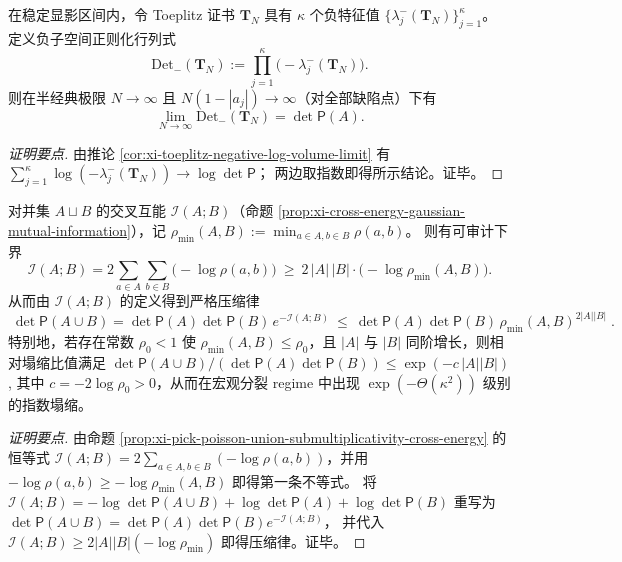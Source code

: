 \begin{corollary}\label{cor:xi-toeplitz-negative-regularized-determinant-limit}
在稳定显影区间内，令 Toeplitz 证书 \(\mathbf{T}_N\) 具有 \(\kappa\) 个负特征值 \(\{\lambda_j^{-}(\mathbf{T}_N)\}_{j=1}^{\kappa}\)。
定义负子空间正则化行列式
\[
\mathrm{Det}_{-}(\mathbf{T}_N):=\prod_{j=1}^{\kappa}\bigl(-\lambda_j^{-}(\mathbf{T}_N)\bigr).
\]
则在半经典极限 \(N\to\infty\) 且 \(N(1-|a_j|)\to\infty\)（对全部缺陷点）下有
\[
\boxed{\;
\lim_{N\to\infty}\mathrm{Det}_{-}(\mathbf{T}_N)=\det\mathsf P(A).\;}
\]
\end{corollary}
\begin{proof}[证明要点]
由推论 \ref{cor:xi-toeplitz-negative-log-volume-limit} 有
\(\sum_{j=1}^{\kappa}\log(-\lambda_j^{-}(\mathbf{T}_N))\to \log\det\mathsf P\)；
两边取指数即得所示结论。证毕。
\end{proof}

\begin{corollary}\label{cor:xi-cross-energy-lower-bound-by-min-separation}
对并集 \(A\sqcup B\) 的交叉互能 \(\mathcal I(A;B)\)（命题 \ref{prop:xi-cross-energy-gaussian-mutual-information}），记
\(
\rho_{\min}(A,B):=\min_{a\in A,b\in B}\rho(a,b)
\)。
则有可审计下界
\[
\boxed{\;
\mathcal I(A;B)
=2\sum_{a\in A}\sum_{b\in B}\bigl(-\log\rho(a,b)\bigr)
\ \ge\
2\,|A|\,|B|\cdot\bigl(-\log\rho_{\min}(A,B)\bigr).\;}
\]
从而由 \(\mathcal I(A;B)\) 的定义得到严格压缩律
\[
\boxed{\;
\det\mathsf P(A\cup B)
=\det\mathsf P(A)\det\mathsf P(B)\,e^{-\mathcal I(A;B)}
\ \le\
\det\mathsf P(A)\det\mathsf P(B)\,\rho_{\min}(A,B)^{2|A||B|}\; }.
\]
特别地，若存在常数 \(\rho_0<1\) 使 \(\rho_{\min}(A,B)\le \rho_0\)，且 \(|A|\) 与 \(|B|\) 同阶增长，则相对塌缩比值满足
\(
\det\mathsf P(A\cup B)\big/(\det\mathsf P(A)\det\mathsf P(B))
\le \exp(-c\,|A||B|)
\),
其中 \(c=-2\log\rho_0>0\)，从而在宏观分裂 regime 中出现 \(\exp(-\Theta(\kappa^2))\) 级别的指数塌缩。
\end{corollary}
\begin{proof}[证明要点]
由命题 \ref{prop:xi-pick-poisson-union-submultiplicativity-cross-energy} 的恒等式
\(\mathcal I(A;B)=2\sum_{a\in A,b\in B}(-\log\rho(a,b))\)，并用
\(-\log\rho(a,b)\ge -\log\rho_{\min}(A,B)\) 即得第一条不等式。
将 \(\mathcal I(A;B)=-\log\det\mathsf P(A\cup B)+\log\det\mathsf P(A)+\log\det\mathsf P(B)\) 重写为
\(
\det\mathsf P(A\cup B)=\det\mathsf P(A)\det\mathsf P(B)e^{-\mathcal I(A;B)}
\)，
并代入 \(\mathcal I(A;B)\ge 2|A||B|(-\log\rho_{\min})\) 即得压缩律。证毕。
\end{proof}

